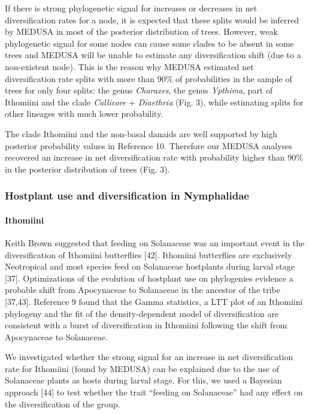 \documentclass[]{article}
\begin{document}
If there is strong phylogenetic signal for increases or decreases in net
diversification rates for a node, it is expected that these splits would
be inferred by MEDUSA in most of the posterior distribution of trees.
However, weak phylogenetic signal for some nodes can cause some clades
to be absent in some trees and MEDUSA will be unable to estimate any
diversification shift (due to a non-existent node). This is the reason
why MEDUSA estimated net diversification rate splits with more than 90\%
of probabilities in the sample of trees for only four splits: the genus
\emph{Charaxes}, the genus \emph{Ypthima}, part of Ithomiini and the
clade \emph{Callicore} + \emph{Diaethria} (Fig. 3), while estimating
splits for other lineages with much lower probability.

The clade Ithomiini and the non-basal danaids are well supported by high
posterior probability values in Reference 10. Therefore our MEDUSA
analyses recovered an increase in net diversification rate with
probability higher than 90\% in the posterior distribution of trees
(Fig. 3).

\subsubsection{Hostplant use and diversification in
Nymphalidae}\label{hostplant-use-and-diversification-in-nymphalidae}

\paragraph{Ithomiini}\label{ithomiini}

Keith Brown suggested that feeding on Solanaceae was an important event
in the diversification of Ithomiini butterflies {[}42{]}. Ithomiini
butterflies are exclusively Neotropical and most species feed on
Solanaceae hostplants during larval stage {[}37{]}. Optimizations of the
evolution of hostplant use on phylogenies evidence a probable shift from
Apocynaceae to Solanaceae in the ancestor of the tribe {[}37,43{]}.
Reference 9 found that the Gamma statistics, a LTT plot of an Ithomiini
phylogeny and the fit of the density-dependent model of diversification
are consistent with a burst of diversification in Ithomiini following
the shift from Apocynaceae to Solanaceae.

We investigated whether the strong signal for an increase in net
diversification rate for Ithomiini (found by MEDUSA) can be explained
due to the use of Solanaceae plants as hosts during larval stage. For
this, we used a Bayesian approach {[}44{]} to test whether the trait
``feeding on Solanaceae'' had any effect on the diversification of the
group.
\end{document}
